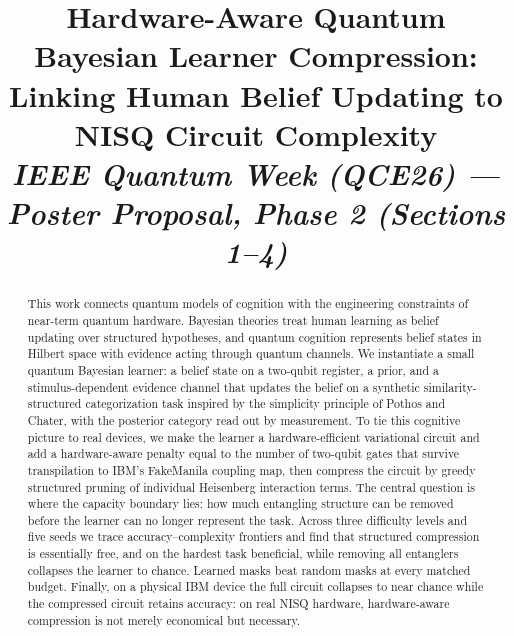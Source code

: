 \documentclass[10pt,conference]{IEEEtran}
\begin{document}
\title{Hardware-Aware Quantum Bayesian Learner Compression:\\ Linking Human Belief Updating to NISQ Circuit Complexity\\
\large\normalfont\itshape IEEE Quantum Week (QCE26) --- Poster Proposal, Phase 2 (Sections 1--4)}

\author{
}

\maketitle

\begin{abstract}
This work connects quantum models of cognition with the engineering constraints of
near-term quantum hardware. Bayesian theories treat human learning as belief updating over
structured hypotheses, and quantum cognition represents belief states in Hilbert space with
evidence acting through quantum channels. We instantiate a small quantum Bayesian learner: a
belief state on a two-qubit register, a prior, and a stimulus-dependent evidence channel that
updates the belief on a synthetic similarity-structured categorization task inspired by the
simplicity principle of Pothos and Chater, with the posterior category read out by
measurement. To tie this cognitive picture to real devices, we make the learner a
hardware-efficient variational circuit and add a hardware-aware penalty equal to the number
of two-qubit gates that survive transpilation to IBM's FakeManila coupling map, then compress
the circuit by greedy structured pruning of individual Heisenberg interaction terms. The
central question is where the capacity boundary lies: how much entangling structure can be
removed before the learner can no longer represent the task. Across three difficulty levels
and five seeds we trace accuracy--complexity frontiers and find that structured compression is
essentially free, and on the hardest task beneficial, while removing all entanglers collapses
the learner to chance. Learned masks beat random masks at every matched budget. Finally, on a
physical IBM device the full circuit collapses to near chance while the compressed circuit
retains accuracy: on real NISQ hardware, hardware-aware compression is not merely economical
but necessary.
\end{abstract}
\end{document}

